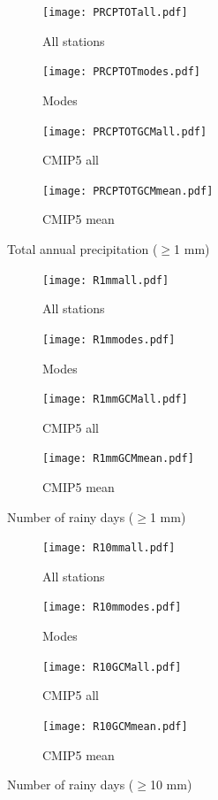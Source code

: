 \documentclass{article}
\begin{document}
\begin{figure}[H]
	\centering
	\begin{subfigure}{0.5\textwidth}
		\centering
		\texttt{[image: PRCPTOTall.pdf]}
		\caption{All stations}
	\end{subfigure}%
	\begin{subfigure}{0.5\textwidth}
		\centering
		\texttt{[image: PRCPTOTmodes.pdf]}
		\caption{Modes}
	\end{subfigure}
	\begin{subfigure}{0.5\textwidth}
		\centering
		\texttt{[image: PRCPTOTGCMall.pdf]}
		\caption{CMIP5 all}
	\end{subfigure}%
	\begin{subfigure}{0.5\textwidth}
		\centering
		\texttt{[image: PRCPTOTGCMmean.pdf]}
		\caption{CMIP5 mean}
	\end{subfigure}
	\caption{Total annual precipitation ($\geq$1 mm)}
	\label{PRCPTOT}
\end{figure}

\begin{figure}[H]
	\centering
	\begin{subfigure}{0.5\textwidth}
		\centering
		\texttt{[image: R1mmall.pdf]}
		\caption{All stations}
	\end{subfigure}%
	\begin{subfigure}{0.5\textwidth}
		\centering
		\texttt{[image: R1mmodes.pdf]}
		\caption{Modes}
	\end{subfigure}
	\begin{subfigure}{0.5\textwidth}
		\centering
		\texttt{[image: R1mmGCMall.pdf]}
		\caption{CMIP5 all}
	\end{subfigure}%
	\begin{subfigure}{0.5\textwidth}
		\centering
		\texttt{[image: R1mmGCMmean.pdf]}
		\caption{CMIP5 mean}
	\end{subfigure}
	\caption{Number of rainy days ($\geq$1 mm)}
	\label{R1mm}
\end{figure}

\begin{figure}[H]
	\centering
	\begin{subfigure}{0.5\textwidth}
		\centering
		\texttt{[image: R10mmall.pdf]}
		\caption{All stations}
	\end{subfigure}%
	\begin{subfigure}{0.5\textwidth}
		\centering
		\texttt{[image: R10mmodes.pdf]}
		\caption{Modes}
	\end{subfigure}
	\begin{subfigure}{0.5\textwidth}
		\centering
		\texttt{[image: R10GCMall.pdf]}
		\caption{CMIP5 all}
	\end{subfigure}%
	\begin{subfigure}{0.5\textwidth}
		\centering
		\texttt{[image: R10GCMmean.pdf]}
		\caption{CMIP5 mean}
	\end{subfigure}
	\caption{Number of rainy days ($\geq$10 mm)}
	\label{R10mm}
\end{figure}
\end{document}
